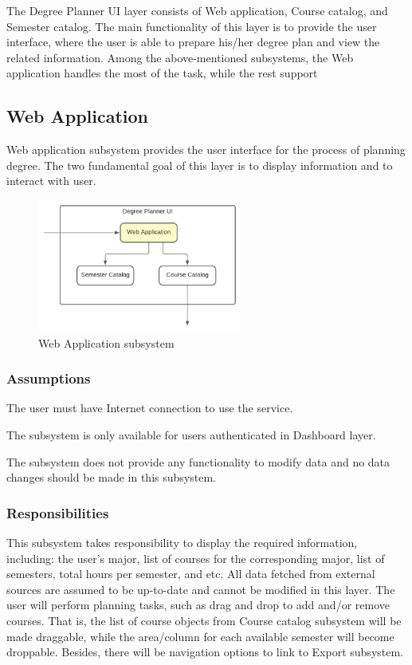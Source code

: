 The Degree Planner UI layer consists of Web application, Course catalog, and Semester catalog. The main functionality of this layer is to provide the user interface, where the user is able to prepare his/her degree plan and view the related information. Among the above-mentioned subsystems, the Web application handles the most of the task, while the rest support

\subsection{Web Application}
Web application subsystem provides the user interface for the process of planning degree. The two fundamental goal of this layer is to display information and to interact with user.

\begin{figure}[h!]
	\centering
 	\includegraphics[width=0.60\textwidth]{images/WebApplication}
 \caption{Web Application subsystem}
\end{figure}

\subsubsection{Assumptions}
\begin{itemize}
\begin{item}
The user must have Internet connection to use the service.
\end{item}
\begin{item}
The subsystem is only available for users authenticated in Dashboard layer.
\end{item}
\begin{item}
The subsystem does not provide any functionality to modify data and no data changes should be made in this subsystem.
\end{item}
\end{itemize}

\subsubsection{Responsibilities}
This subsystem takes responsibility to display the required information, including: the user's major, list of courses for the corresponding major, list of semesters, total hours per semester, and etc. All data fetched from external sources are assumed to be up-to-date and cannot be modified in this layer. The user will perform planning tasks, such as drag and drop to add and/or remove courses. That is, the list of course objects from Course catalog subsystem will be made draggable, while the area/column for each available semester will become droppable. Besides, there will be navigation options to link to Export subsystem.


